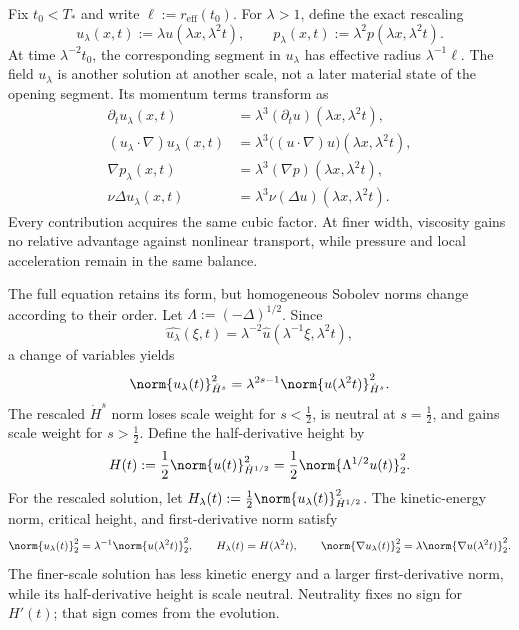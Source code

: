 Fix \(t_0<T_*\) and write \(\ell:=r_{\mathrm{eff}}(t_0)\). For \(\lambda>1\), define the exact \NavierStokes{} rescaling
\[
  u_\lambda(x,t)
  :=
  \lambda u(\lambda x,\lambda^2t),
  \qquad
  p_\lambda(x,t)
  :=
  \lambda^2p(\lambda x,\lambda^2t).
\]
At time \(\lambda^{-2}t_0\), the corresponding segment in \(u_\lambda\) has effective radius \(\lambda^{-1}\ell\). The field \(u_\lambda\) is another solution at another scale, not a later material state of the opening segment. Its momentum terms transform as
\[
\begin{aligned}
  \partial_tu_\lambda(x,t)
  &=
  \lambda^3(\partial_tu)(\lambda x,\lambda^2t),
  \\
  (u_\lambda\cdot\nabla)u_\lambda(x,t)
  &=
  \lambda^3\bigl((u\cdot\nabla)u\bigr)(\lambda x,\lambda^2t),
  \\
  \nabla p_\lambda(x,t)
  &=
  \lambda^3(\nabla p)(\lambda x,\lambda^2t),
  \\
  \nu\Delta u_\lambda(x,t)
  &=
  \lambda^3\nu(\Delta u)(\lambda x,\lambda^2t).
\end{aligned}
\]
Every contribution acquires the same cubic factor. At finer width, viscosity gains no relative advantage against nonlinear transport, while pressure and local acceleration remain in the same balance.


The full equation retains its form, but homogeneous Sobolev norms change according to their order. Let \(\Lambda:=(-\Delta)^{1/2}\). Since
\[
  \widehat{u_\lambda}(\xi,t)
  =
  \lambda^{-2}\widehat u(\lambda^{-1}\xi,\lambda^2t),
\]
a change of variables yields
\[
  \norm{u_\lambda(t)}_{\dot H^s}^2
  =
  \lambda^{2s-1}
  \norm{u(\lambda^2t)}_{\dot H^s}^2.
\]
The rescaled \(\dot H^s\) norm loses scale weight for \(s<\tfrac12\), is neutral at \(s=\tfrac12\), and gains scale weight for \(s>\tfrac12\). Define the half-derivative height by
\[
  H(t)
  :=
  \frac12\norm{u(t)}_{\dot H^{1/2}}^2
  =
  \frac12\norm{\Lambda^{1/2}u(t)}_2^2.
\]
For the rescaled solution, let \(H_\lambda(t):=\tfrac12\norm{u_\lambda(t)}_{\dot H^{1/2}}^2\). The kinetic-energy norm, critical height, and first-derivative norm satisfy
\[
  \norm{u_\lambda(t)}_2^2
  =
  \lambda^{-1}\norm{u(\lambda^2t)}_2^2,
  \qquad
  H_\lambda(t)=H(\lambda^2t),
  \qquad
  \norm{\nabla u_\lambda(t)}_2^2
  =
  \lambda\norm{\nabla u(\lambda^2t)}_2^2.
\]
The finer-scale solution has less kinetic energy and a larger first-derivative norm, while its half-derivative height is scale neutral. Neutrality fixes no sign for \(H'(t)\); that sign comes from the evolution.

